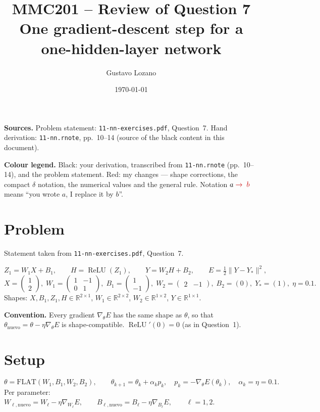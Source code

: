 \documentclass[11pt,a4paper]{article}
\title{MMC201 -- Review of Question 7\\[2pt]\large One gradient-descent step for a one-hidden-layer network}
\author{Gustavo Lozano}
\date{\today}
\newcommand{\R}{\mathbb{R}}
\newcommand{\relu}{\operatorname{ReLU}}
\newcommand{\C}[1]{{\color{chg}#1}}          %
\begin{document}
\maketitle

\begin{tcolorbox}[boxstyle]
\textbf{Sources.} Problem statement: \texttt{11-nn-exercises.pdf}, Question~7.
Hand derivation: \texttt{11-nn.rnote}, pp.~10--14 (source of the black content in this document).

\medskip
\textbf{Colour legend.} Black: your derivation, transcribed from \texttt{11-nn.rnote} (pp.~10--14), and
the problem statement. \C{Red: my changes} --- shape corrections, the compact $\delta$ notation, the numerical
values and the general rule. Notation $a\;\C{\to\;b}$ means ``you wrote $a$, I replace it by $b$''.
\end{tcolorbox}

\section{Problem}
Statement taken from \texttt{11-nn-exercises.pdf}, Question~7.

\[
Z_1 = W_1X + B_1,\qquad H = \relu(Z_1),\qquad Y = W_2H + B_2,\qquad
E = \tfrac12\lVert Y - Y_*\rVert^2,
\]
\[
X=\begin{pmatrix}1\\2\end{pmatrix},\;
W_1=\begin{pmatrix}1&-1\\0&1\end{pmatrix},\;
B_1=\begin{pmatrix}1\\-1\end{pmatrix},\;
W_2=\begin{pmatrix}2&-1\end{pmatrix},\;
B_2=(0),\;
Y_*=(1),\;
\eta=0.1 .
\]
Shapes: $X,B_1,Z_1,H\in\R^{2\times1}$, $W_1\in\R^{2\times2}$, $W_2\in\R^{1\times2}$, $Y\in\R^{1\times1}$.

\C{\textbf{Convention.} Every gradient $\nabla_\theta E$ has the same shape as $\theta$, so that
$\theta_{\text{nuevo}}=\theta-\eta\nabla_\theta E$ is shape-compatible. $\relu'(0)=0$ (as in Question~1).}

\section{Setup}

\[
\theta=\mathrm{FLAT}(W_1,B_1,W_2,B_2),\qquad
\theta_{k+1}=\theta_k+\alpha_k p_k,\quad p_k=-\nabla_\theta E(\theta_k),\quad \alpha_k=\eta=0.1 .
\]
\C{Per parameter: \quad $W_{\ell,\text{nuevo}}=W_\ell-\eta\nabla_{W_\ell}E,\qquad B_{\ell,\text{nuevo}}=B_\ell-\eta\nabla_{B_\ell}E,\qquad \ell=1,2.$}
\end{document}
